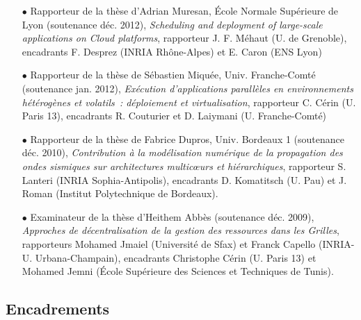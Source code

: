 \begin{itemize}

\item[$\bullet$] 
Rapporteur de la thèse d'Adrian Muresan, \'Ecole Normale Supérieure de Lyon
(soutenance déc. 2012), \textit{Scheduling and deployment of large-scale applications on 
Cloud platforms},
rapporteur J. F. Méhaut (U. de Grenoble), 
encadrants F. Desprez (INRIA Rhône-Alpes) et E. Caron (ENS Lyon)\\
\item[$\bullet$] 
Rapporteur de la thèse de Sébastien Miquée, Univ. Franche-Comté (soutenance 
jan. 2012), \textit{Exécution d'applications parallèles en environnements 
hétérogènes et volatils~: déploiement et virtualisation},
rapporteur C. Cérin (U. Paris 13), 
encadrants R. Couturier et D. Laiymani (U. Franche-Comté)\\
\item[$\bullet$] 
Rapporteur de la thèse de Fabrice Dupros, Univ. Bordeaux 1 (soutenance déc. 2010), 
\textit{Contribution à la modélisation numérique de la propagation des ondes 
sismiques sur architectures multic{\oe}urs et hiérarchiques},
rapporteur S. Lanteri (INRIA Sophia-Antipolis), 
encadrants D. Komatitsch (U. Pau) et J. Roman (Institut Polytechnique de 
Bordeaux).\\

\item[$\bullet$] 
Examinateur de la thèse d'Heithem Abbès (soutenance déc. 2009), 
\textit{Approches de décentralisation de la gestion des ressources dans les 
Grilles}, rapporteurs Mohamed Jmaiel (Université de Sfax) et Franck Capello 
(INRIA-U. Urbana-Champain), encadrants Christophe Cérin (U. Paris 13) et 
Mohamed Jemni (École Supérieure des Sciences et Techniques de Tunis).
\end{itemize}




\subsection{Encadrements}

